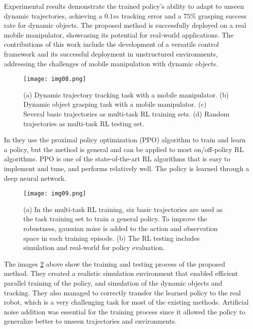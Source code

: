 Experimental results demonstrate the trained policy's ability to adapt to unseen dynamic
trajectories, achieving a $0.1m$ tracking error and a $75\%$ grasping success rate for dynamic objects.
The proposed method is successfully deployed on a real mobile manipulator, showcasing its
potential for real-world applications. The contributions of this work include the development
of a versatile control framework and its successful deployment in unstructured environments,
addressing the challenges of mobile manipulation with dynamic objects.

\begin{figure}[ht]
	\centering
	\texttt{[image: img08.png]}
	\captionsetup{width=1\linewidth}
	\caption{(a) Dynamic trajectory tracking task with a mobile manipulator. (b)
		Dynamic object grasping task with a mobile manipulator. (c) Several basic
		trajectories as multi-task RL training sets. (d) Random trajectories as multi-task
		RL testing set.\cite{wang2022multitask}}
	\label{fig:img08}
\end{figure}

In \cite{wang2022multitask} they use the proximal policy optimization (PPO) algorithm to train
and learn a policy, but the method is general and can be applied to most on/off-policy RL algorithms.
PPO is one of the state-of-the-art RL algorithms that is easy to implement and tune, and performs
relatively well. The policy is learned through a deep neural network.

\begin{figure}[ht]
	\centering
	\texttt{[image: img09.png]}
	\captionsetup{width=1\linewidth}
	\caption{(a) In the multi-task RL training, six basic trajectories are used as the task
		training set to train a general policy. To improve the robustness, gaussian noise is added
		to the action and observation space in each training episode. (b) The RL testing includes
		simulation and real-world for policy evaluation.\cite{wang2022multitask}}
	\label{fig:img09}
\end{figure}

The images \ref{fig:img09} above show the training and testing process of the proposed method. They created a
realistic simulation environment that enabled efficient parallel training of the policy,
and simulation of the dynamic objects and tracking. They also managed to correctly transfer the
learned policy to the real robot, which is a very challenging task for most of the existing methods.
Artificial noise addition was essential for the training process since it allowed the policy
to generalize better to unseen trajectories and environments.

